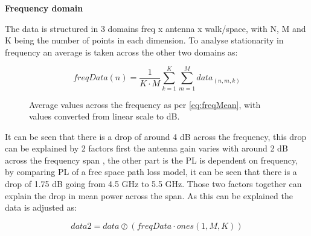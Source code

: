 \textbf{Frequency domain}

The data is structured in 3 domains freq x antenna x walk/space, with N, M and K being the number of points in each dimension. To analyse stationarity in frequency an average is taken across the other two domains as:

\begin{equation}\label{eq:freqMean}
freqData(n) = \frac{1}{K\cdot M}\sum_{k = 1}^{K}\sum_{m = 1}^{M} data_{(n,m,k)}
\end{equation}

\begin{figure}[H]
\centering

\caption{Average values across the frequency as per \autoref{eq:freqMean}, with values converted from linear scale to dB.}
\label{fig:meanFading}
\end{figure}

It can be seen that there is a drop of around 4 dB across the frequency, this drop can be explained by 2 factors first the antenna gain varies with around 2 dB across the frequency span , the other part is the \gls{PL} is dependent on frequency, by comparing PL of a free space path loss model, it can be seen that there is a drop of 1.75 dB going from 4.5 GHz to 5.5 GHz. Those two factors together can explain the drop in mean power across the span. As this can be explained the data is adjusted as:

\begin{equation}
data2 =  data \oslash \left(freqData\cdot ones(1,M,K)\right)
\end{equation}





